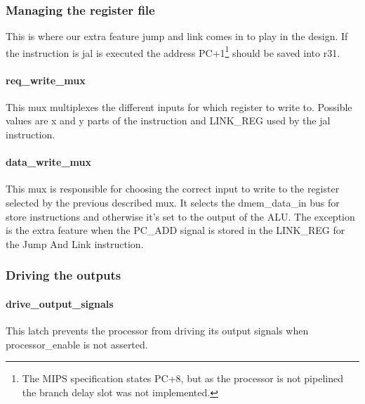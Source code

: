 \subsubsection{Managing the register file}

This is where our extra feature jump and link comes in to play in the design. If the instruction 
is jal is executed the address PC+1\footnote{The MIPS specification states PC+8, but as the processor 
is not pipelined the branch delay slot was not implemented.} should be saved into r31.

\paragraph{req\_write\_mux} This mux multiplexes the different inputs for which register to write to. 
Possible values are x and y parts of the instruction and LINK\_REG used by the jal instruction. 

\paragraph{data\_write\_mux} This mux is responsible for choosing the correct input to write to the 
register selected by the previous described mux. It selects the dmem\_data\_in bus for store instructions 
and otherwise it's set to the output of the ALU. The exception is the extra feature when the PC\_ADD signal 
is stored in the LINK\_REG for the Jump And Link instruction.

\subsubsection{Driving the outputs}

\paragraph{drive\_output\_signals} This latch prevents the processor from driving its output signals when processor\_enable is not asserted. 

